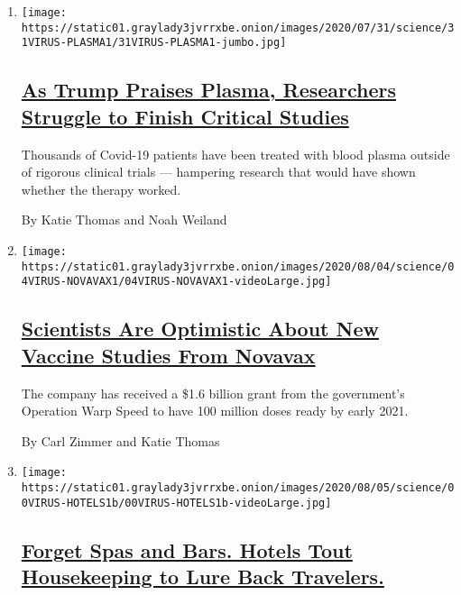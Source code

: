 \begin{enumerate}
\def\labelenumi{\arabic{enumi}.}
\item
  \texttt{[image: https://static01.graylady3jvrrxbe.onion/images/2020/07/31/science/31VIRUS-PLASMA1/31VIRUS-PLASMA1-jumbo.jpg]}

  \hypertarget{as-trump-praises-plasma-researchers-struggle-to-finish-critical-studies}{%
  \subsection{\texorpdfstring{\href{/2020/08/04/health/trump-plasma.html}{As
  Trump Praises Plasma, Researchers Struggle to Finish Critical
  Studies}}{As Trump Praises Plasma, Researchers Struggle to Finish Critical Studies}}\label{as-trump-praises-plasma-researchers-struggle-to-finish-critical-studies}}

  Thousands of Covid-19 patients have been treated with blood plasma
  outside of rigorous clinical trials --- hampering research that would
  have shown whether the therapy worked.

  By Katie Thomas and Noah Weiland
\item
  \texttt{[image: https://static01.graylady3jvrrxbe.onion/images/2020/08/04/science/04VIRUS-NOVAVAX1/04VIRUS-NOVAVAX1-videoLarge.jpg]}

  \hypertarget{scientists-are-optimistic-about-new-vaccine-studies-from-novavax}{%
  \subsection{\texorpdfstring{\href{/2020/08/04/health/covid-19-vaccine-novavax.html}{Scientists
  Are Optimistic About New Vaccine Studies From
  Novavax}}{Scientists Are Optimistic About New Vaccine Studies From Novavax}}\label{scientists-are-optimistic-about-new-vaccine-studies-from-novavax}}

  The company has received a \$1.6 billion grant from the government's
  Operation Warp Speed to have 100 million doses ready by early 2021.

  By Carl Zimmer and Katie Thomas
\item
  \texttt{[image: https://static01.graylady3jvrrxbe.onion/images/2020/08/05/science/00VIRUS-HOTELS1b/00VIRUS-HOTELS1b-videoLarge.jpg]}

  \hypertarget{forget-spas-and-bars-hotels-tout-housekeeping-to-lure-back-travelers}{%
  \subsection{\texorpdfstring{\href{/2020/08/04/health/coronavirus-hotels-infect.html}{Forget
  Spas and Bars. Hotels Tout Housekeeping to Lure Back
  Travelers.}}{Forget Spas and Bars. Hotels Tout Housekeeping to Lure Back Travelers.}}\label{forget-spas-and-bars-hotels-tout-housekeeping-to-lure-back-travelers}}


\end{enumerate}

